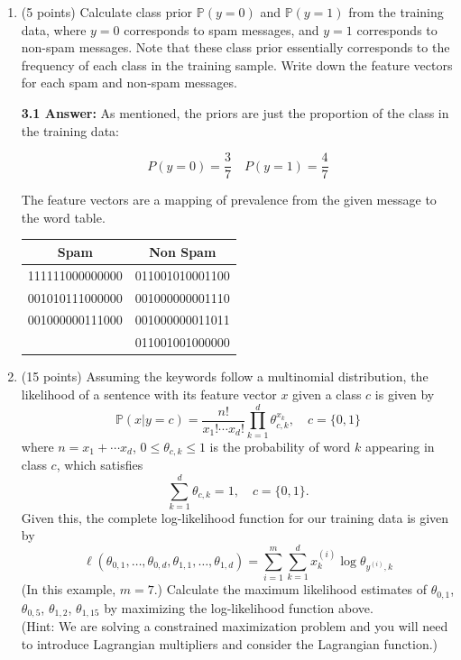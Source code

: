 \documentclass[12pt]{article}
\begin{document}
\begin{enumerate}
\item (5 points) Calculate class prior $\mathbb P(y = 0)$ and $\mathbb P(y = 1)$ from the training data, where $y = 0$ corresponds to spam messages, and $y = 1$ corresponds to non-spam messages. Note that these class prior essentially corresponds to the frequency of each class in the training sample. Write down the feature vectors for each spam and non-spam messages.

{\bf 3.1 Answer:} As mentioned, the priors are just the proportion of the class in the training data:

\[
    P(y=0) = \frac{3}{7} \quad
    P(y=1) = \frac{4}{7}
\]

The feature vectors are a mapping of prevalence from the given message to the word table.
\begin{table}[H]
    \centering
    \begin{tabular}{|c|c|}
        \hline
        \textbf{Spam} & \textbf{Non Spam} \\
        \hline
        \textsf{111111000000000} & \textsf{011001010001100} \\
        \hline
        \textsf{001010111000000} & \textsf{001000000001110} \\
        \hline
        \textsf{001000000111000} & \textsf{001000000011011} \\
        \hline
        & \textsf{011001001000000} \\
        \hline
    \end{tabular}
\end{table}

\item (15 points)  Assuming the keywords follow a multinomial distribution, the likelihood of a sentence with its feature vector $x$ given a class $c$ is given by 
\[
 \mathbb P (x|y = c) = \frac{n!}{x_1! \cdots x_d!}\prod_{k=1}^d \theta_{c, k}^{x_k}, \quad c = \{0, 1\}
\]
where $n = x_1 + \cdots x_d$, $0 \leq \theta_{c,k} \leq 1$ is the probability of word $k$ appearing in class $c$, which satisfies 
\[\sum_{k=1}^d \theta_{c,k} = 1, \quad c = \{0, 1\}.\] Given this, the complete log-likelihood function for our training data is given by
\[
\ell(\theta_{0,1}, \ldots, \theta_{0, d}, \theta_{1,1}, \ldots, \theta_{1, d}) = 
\sum_{i=1}^m \sum_{k=1}^d x_k^{(i)} \log \theta_{y^{(i)}, k}
\]
(In this example, $m = 7$.)
 Calculate the maximum likelihood estimates of $\theta_{0,1}$, $\theta_{0,5}$, $\theta_{1,2}$, $\theta_{1,15}$ by maximizing the log-likelihood function above.\\
 (Hint: We are solving a constrained maximization problem and you will need to introduce Lagrangian multipliers and consider the Lagrangian function.)


\end{enumerate}
\end{document}
